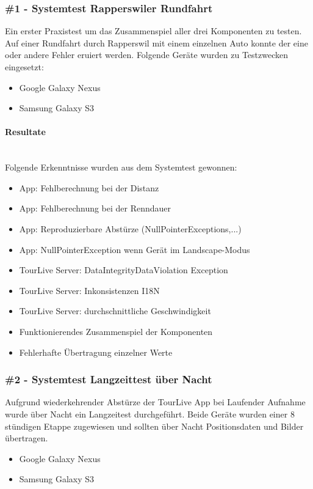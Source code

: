 \subsubsection{\#1 - Systemtest Rapperswiler Rundfahrt}
Ein erster Praxistest um das Zusammenspiel aller drei Komponenten zu testen. Auf einer Rundfahrt durch Rapperswil mit einem einzelnen Auto konnte der eine oder andere Fehler eruiert werden. Folgende Geräte wurden zu Testzwecken eingesetzt:
\begin{itemize} [noitemsep,topsep=0pt]
	\item{Google Galaxy Nexus}
	\item{Samsung Galaxy S3}
\end{itemize}

\paragraph*{Resultate} \mbox{} \\
Folgende Erkenntnisse wurden aus dem Systemtest gewonnen:
\begin{itemize}[noitemsep,topsep=0pt]
	\item App: Fehlberechnung bei der Distanz
	\item App: Fehlberechnung bei der Renndauer
	\item App: Reproduzierbare Abstürze (NullPointerExceptions,...)
	\item App: NullPointerException wenn Gerät im Landscape-Modus
	\item TourLive Server: DataIntegrityDataViolation Exception
	\item TourLive Server: Inkonsistenzen I18N
	\item TourLive Server: durchschnittliche Geschwindigkeit
	\item Funktionierendes Zusammenspiel der Komponenten
	\item Fehlerhafte Übertragung einzelner Werte
\end{itemize}

\subsubsection{\#2 - Systemtest Langzeittest über Nacht}
Aufgrund wiederkehrender Abstürze der TourLive App bei Laufender Aufnahme wurde über Nacht ein Langzeitest durchgeführt. Beide Geräte wurden einer 8 stündigen Etappe zugewiesen und sollten über Nacht Positionsdaten und Bilder übertragen. 
\begin{itemize} [noitemsep,topsep=0pt]
	\item{Google Galaxy Nexus}
	\item{Samsung Galaxy S3}
\end{itemize}

